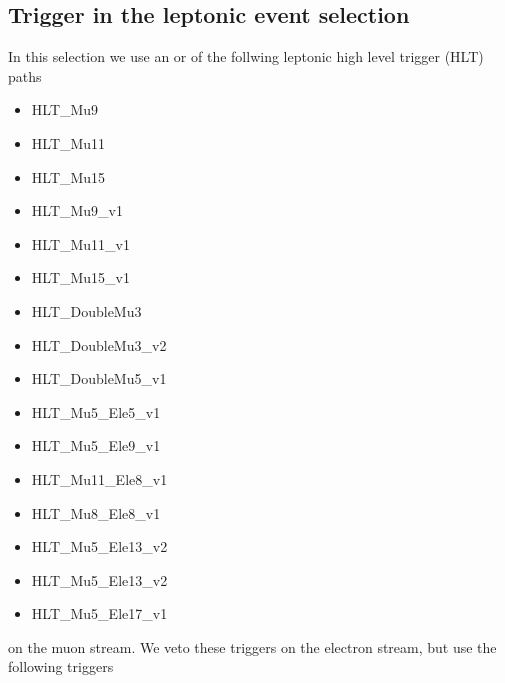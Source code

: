 \subsection{Trigger in the leptonic event selection}

In this selection we use an or of the follwing leptonic high level trigger (HLT) paths
\begin{itemize}
\item
HLT\_Mu9 
\item HLT\_Mu11 
\item HLT\_Mu15 
\item HLT\_Mu9\_v1 
\item HLT\_Mu11\_v1 
\item HLT\_Mu15\_v1 
\item HLT\_DoubleMu3 
\item HLT\_DoubleMu3\_v2 
\item HLT\_DoubleMu5\_v1 
\item HLT\_Mu5\_Ele5\_v1 
\item HLT\_Mu5\_Ele9\_v1 
\item HLT\_Mu11\_Ele8\_v1 
\item HLT\_Mu8\_Ele8\_v1 
\item HLT\_Mu5\_Ele13\_v2 
\item HLT\_Mu5\_Ele13\_v2 
\item HLT\_Mu5\_Ele17\_v1 
\end{itemize}
on the muon stream. We veto these triggers on the electron stream,
but use the following triggers
